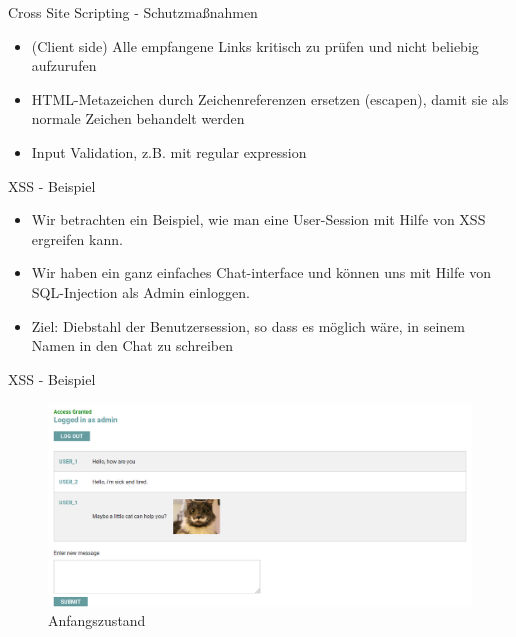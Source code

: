 \documentclass[10pt]{beamer}
\begin{document}
\begin{frame}[fragile]{Cross Site Scripting - Schutzma{\ss}nahmen}
  \begin{itemize}
    \item (Client side) Alle empfangene Links kritisch zu pr\"ufen und nicht beliebig aufzurufen
    \item HTML-Metazeichen durch Zeichenreferenzen ersetzen (escapen), damit sie als normale Zeichen behandelt werden
    \item Input Validation, z.B. mit regular expression
  \end{itemize}
\end{frame}

\begin{frame}[fragile]{XSS - Beispiel}
  \begin{itemize}
    \item Wir betrachten ein Beispiel, wie man eine User-Session mit Hilfe von XSS ergreifen kann.
    \item Wir haben ein ganz einfaches Chat-interface und k\"onnen uns mit Hilfe von SQL-Injection als Admin einloggen.
    \item Ziel: Diebstahl der Benutzersession, so dass es m\"oglich w\"are, in seinem Namen in den Chat zu schreiben
  \end{itemize}
\end{frame}


\begin{frame}[fragile]{XSS - Beispiel}
  \begin{figure}[ht]
      \centering
      \includegraphics[width=\textwidth]{XSS-1.png}
      \caption{Anfangszustand}
      \label{fig:figure1}
  \end{figure}
\end{frame}
\end{document}
